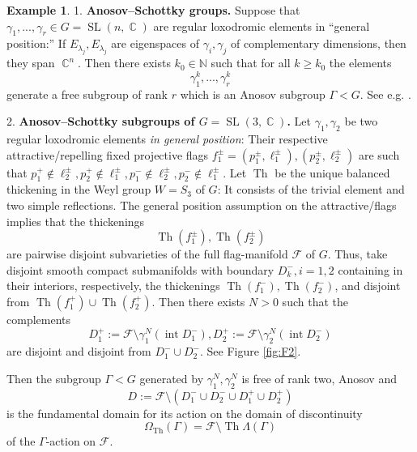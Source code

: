 \documentclass[12pt]{amsbook}%
\theoremstyle{definition}
\newtheorem{example}[thm]{Example}
\theoremstyle{remark}
\numberwithin{section}{chapter}
\numberwithin{subsection}{section}
\numberwithin{figure}{chapter}
\DeclareMathOperator{\C}{\mathbb{C}}
\DeclareMathOperator{\SL}{SL}
\DeclareMathOperator{\Th}{Th}
\def\bN{{\mathbb{N}}}
\def\cF{{\mathscr{F}}}
\def\Ga{\Gamma}
\def\ga{\gamma}
\def\La{\Lambda}
\def\la{\lambda}
\def\inte{\operatorname{int}}
\def\kap{}
\begin{document}
{{\begin{example}
{\kap 

1. {\bf Anosov--Schottky groups.}  Suppose that $\ga_1,...,\ga_r\in G=\SL(n,\C)$ are regular loxodromic elements %
in ``general position:'' If $E_{\la_j}, E_{\la_j}$ are 
eigenspaces of $\ga_i, \ga_j$ of complementary dimensions, then they span $\C^n$. Then there exists $k_0\in \bN$ such that for all $k\ge k_0$ the elements 
$$
\ga_1^k,...,\ga_r^k
$$
generate a free subgroup of rank $r$ which is an Anosov subgroup  $\Ga< G$. See e.g. \cite{KLP14, Dey-Kapovich-Leeb, KLP25}. 

2. {\bf Anosov--Schottky subgroups of $G=\SL(3,\C)$.} Let $\ga_1, \ga_2$ be two regular loxodromic elements {\em in general position}: Their respective attractive/repelling fixed 
projective flags $f^\pm_1=(p^\pm_1,\ell^\pm_1), (p^\pm_2,\ell^\pm_2)$ are such that $p^+_1\notin \ell^\pm_2, p^+_2\notin \ell^\pm_1, p_1^-\notin \ell^\pm_2, p_2^-\notin \ell^\pm_1$. Let $\Th$ be the unique balanced thickening in the Weyl group $W=S_3$ of $G$: It consists of 
the trivial element and two simple reflections. The general position assumption on the attractive/flags implies that the thickenings
$$
\Th(f_1^\pm), \Th(f_2^\pm)
$$
are pairwise disjoint subvarieties of the full flag-manifold $\cF$ of $G$. Thus, take disjoint 
smooth compact submanifolds with boundary $D^-_k, i=1,2$ containing in their interiors, respectively, the thickenings 
$\Th(f_1^-), \Th(f_2^-)$, and disjoint from  $\Th(f_1^+)\cup \Th(f_2^+)$. Then there exists $N>0$ such that the complements 
$$
D_1^+:=\cF\setminus \ga_1^N(\inte D_1^-), D_2^+:=\cF\setminus \ga_2^N(\inte D_2^-)
$$ 
are disjoint and disjoint from $D_1^-\cup D_2^-$. See Figure \ref{fig:F2}. 


Then the subgroup $\Ga<G$ generated by $\ga_1^N, \ga_2^N$ is free of rank two, Anosov and 
$$
D:= \cF \setminus \left(D_1^-\cup D_2^- \cup D_1^+\cup D_2^+ \right)
$$
is the fundamental domain for its action on the domain of discontinuity
$$
\Omega_{\Th}(\Ga)= \cF \setminus \Th\La(\Ga) 
$$
of the $\Ga$-action on $\cF$. 

}
\end{example}}}
\end{document}
